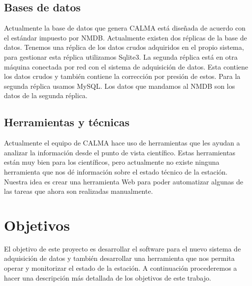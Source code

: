 	\subsection{Bases de datos}
		Actualmente la base de datos que genera CALMA está diseñada de acuerdo con el estándar impuesto por NMDB. Actualmente existen dos
		réplicas de la base de datos. Tenemos una réplica de los datos crudos adquiridos en el propio sistema, para gestionar esta réplica
		utilizamos Sqlite3. La segunda réplica está en otra máquina conectada por red con el sistema de adquisición de datos. Esta contiene
		los datos crudos y también contiene la corrección por presión de estos. Para la segunda réplica usamos MySQL. Los datos que mandamos
		al NMDB son los datos de la segunda réplica.
	\subsection{Herramientas y técnicas}
		Actualmente el equipo de CALMA hace uso de herramientas que les ayudan a analizar la información desde el punto de vista científico.
		Estas herramientas están muy bien para los científicos, pero actualmente no existe ninguna herramienta que nos dé información sobre el
		estado técnico de la estación. Nuestra idea es crear una herramienta Web para poder automatizar algunas de las tareas que ahora son
		realizadas manualmente. 

\section{Objetivos}
	El objetivo de este proyecto es desarrollar el software para el nuevo sistema de adquisición de datos y también desarrollar una herramienta
	que nos permita operar y monitorizar el estado de la estación. A continuación procederemos a hacer una descripción más detallada de los
	objetivos de este trabajo.  
